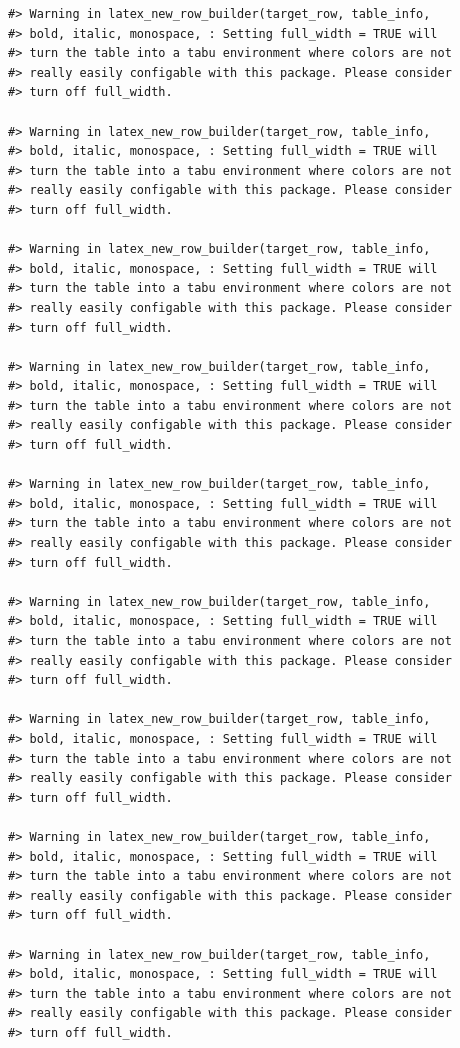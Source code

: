\documentclass[
]{book}
\begin{document}
\begin{verbatim}
#> Warning in latex_new_row_builder(target_row, table_info,
#> bold, italic, monospace, : Setting full_width = TRUE will
#> turn the table into a tabu environment where colors are not
#> really easily configable with this package. Please consider
#> turn off full_width.

#> Warning in latex_new_row_builder(target_row, table_info,
#> bold, italic, monospace, : Setting full_width = TRUE will
#> turn the table into a tabu environment where colors are not
#> really easily configable with this package. Please consider
#> turn off full_width.

#> Warning in latex_new_row_builder(target_row, table_info,
#> bold, italic, monospace, : Setting full_width = TRUE will
#> turn the table into a tabu environment where colors are not
#> really easily configable with this package. Please consider
#> turn off full_width.

#> Warning in latex_new_row_builder(target_row, table_info,
#> bold, italic, monospace, : Setting full_width = TRUE will
#> turn the table into a tabu environment where colors are not
#> really easily configable with this package. Please consider
#> turn off full_width.

#> Warning in latex_new_row_builder(target_row, table_info,
#> bold, italic, monospace, : Setting full_width = TRUE will
#> turn the table into a tabu environment where colors are not
#> really easily configable with this package. Please consider
#> turn off full_width.

#> Warning in latex_new_row_builder(target_row, table_info,
#> bold, italic, monospace, : Setting full_width = TRUE will
#> turn the table into a tabu environment where colors are not
#> really easily configable with this package. Please consider
#> turn off full_width.

#> Warning in latex_new_row_builder(target_row, table_info,
#> bold, italic, monospace, : Setting full_width = TRUE will
#> turn the table into a tabu environment where colors are not
#> really easily configable with this package. Please consider
#> turn off full_width.

#> Warning in latex_new_row_builder(target_row, table_info,
#> bold, italic, monospace, : Setting full_width = TRUE will
#> turn the table into a tabu environment where colors are not
#> really easily configable with this package. Please consider
#> turn off full_width.

#> Warning in latex_new_row_builder(target_row, table_info,
#> bold, italic, monospace, : Setting full_width = TRUE will
#> turn the table into a tabu environment where colors are not
#> really easily configable with this package. Please consider
#> turn off full_width.


\end{verbatim}
\end{document}
